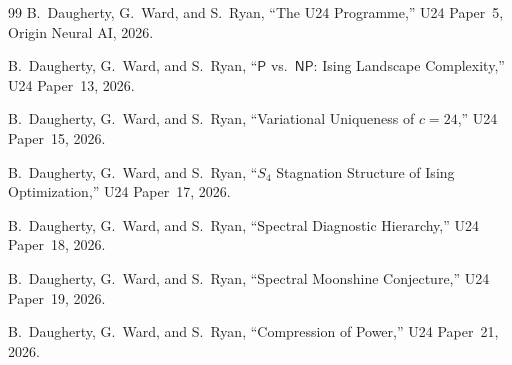 \documentclass[12pt,a4paper]{article}
\theoremstyle{definition}\newtheorem{definition}[theorem]{Definition}
\theoremstyle{remark}\newtheorem{remark}[theorem]{Remark}
\begin{document}
\begin{thebibliography}{99}
B.~Daugherty, G.~Ward, and S.~Ryan, ``The U24 Programme,'' U24 Paper~5,
Origin Neural AI, 2026.

B.~Daugherty, G.~Ward, and S.~Ryan, ``$\mathsf{P}$ vs.\ $\mathsf{NP}$: Ising
Landscape Complexity,'' U24 Paper~13, 2026.

B.~Daugherty, G.~Ward, and S.~Ryan, ``Variational Uniqueness of $c = 24$,''
U24 Paper~15, 2026.

B.~Daugherty, G.~Ward, and S.~Ryan, ``$S_4$ Stagnation Structure of Ising
Optimization,'' U24 Paper~17, 2026.

B.~Daugherty, G.~Ward, and S.~Ryan, ``Spectral Diagnostic Hierarchy,''
U24 Paper~18, 2026.

B.~Daugherty, G.~Ward, and S.~Ryan, ``Spectral Moonshine Conjecture,''
U24 Paper~19, 2026.

B.~Daugherty, G.~Ward, and S.~Ryan, ``Compression of Power,''
U24 Paper~21, 2026.

\end{thebibliography}
\end{document}
